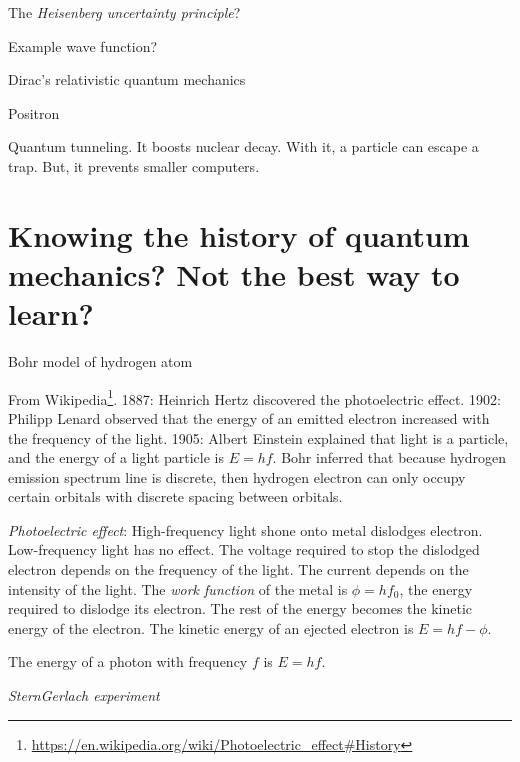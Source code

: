 
The \emph{Heisenberg uncertainty principle}?

Example wave function?

Dirac's relativistic quantum mechanics

Positron

Quantum tunneling.
It boosts nuclear decay.
With it, a particle can escape a trap.
But, it prevents smaller computers.

\section{Knowing the history of quantum mechanics? Not the best way to learn?}

Bohr model of hydrogen atom

From Wikipedia\footnote{\url{https://en.wikipedia.org/wiki/Photoelectric_effect\#History}}.
1887: Heinrich Hertz discovered the photoelectric effect.
1902: Philipp Lenard observed that the energy of an emitted electron increased with the frequency of the light.
1905: Albert Einstein explained that light is a particle, and the energy of a light particle is \(E = hf\).
Bohr inferred that because hydrogen emission spectrum line is discrete,
then hydrogen electron can only occupy certain orbitals with discrete spacing between orbitals.

\emph{Photoelectric effect}:
High-frequency light shone onto metal dislodges electron.
Low-frequency light has no effect.
The voltage required to stop the dislodged electron
depends on the frequency of the light.
The current depends on the intensity of the light.
The \emph{work function} of the metal is \( \phi = h f_0 \),
the energy required to dislodge its electron.
The rest of the energy becomes the kinetic energy of the electron.
The kinetic energy of an ejected electron is \( E = h f - \phi \).

The energy of a photon with frequency \(f\) is \( E = hf \).

\emph{Stern\textendash{}Gerlach experiment}


